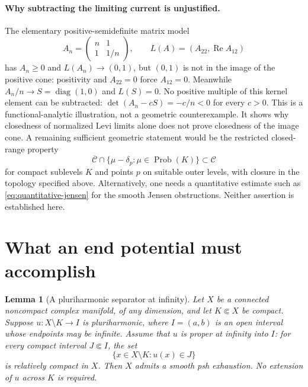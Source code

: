 \documentclass[11pt]{article}
\newtheorem{lemma}[theorem]{Lemma}
\theoremstyle{remark}
\begin{document}
\paragraph{Why subtracting the limiting current is unjustified.}
The elementary positive-semidefinite matrix model
\[
 A_n=\begin{pmatrix}n&1\\1&1/n\end{pmatrix},\qquad
 L(A)=(A_{22},\operatorname{Re}A_{12})
\]
has $A_n\ge0$ and $L(A_n)\to(0,1)$, but $(0,1)$ is not in the image
of the positive cone: positivity and $A_{22}=0$ force $A_{12}=0$.
Meanwhile $A_n/n\to S=\operatorname{diag}(1,0)$ and $L(S)=0$.
No positive multiple of this kernel element can be subtracted:
$\det(A_n-cS)=-c/n<0$ for every $c>0$.
This is a functional-analytic illustration, not a geometric
counterexample. It shows why closedness of normalized Levi limits alone
does not prove closedness of the image cone. A remaining sufficient
geometric statement would be the restricted closed-range property
\[
 \overline{\mathcal C}\cap
   \{\mu-\delta_p:\mu\in\operatorname{Prob}(K)\}
 \subset\mathcal C
\]
for compact sublevels $K$ and points $p$ on suitable outer levels,
with closure in the topology specified above. Alternatively, one needs
a quantitative estimate such as \eqref{eq:quantitative-jensen} for the
smooth Jensen obstructions. Neither assertion is established here.



\section{What an end potential must accomplish}\label{sec:separation-envelope}

\begin{lemma}[A pluriharmonic separator at infinity]
\label{lem:interval-separator}
Let $X$ be a connected noncompact complex manifold, of any dimension,
and let $K\Subset X$ be compact. Suppose $u:X\setminus K\to I$ is
pluriharmonic, where $I=(a,b)$ is an open interval whose endpoints may
be infinite. Assume that $u$ is proper at infinity into $I$: for every
compact interval $J\Subset I$, the set
\[
 \{x\in X\setminus K:u(x)\in J\}
\]
is relatively compact in $X$. Then $X$ admits a smooth psh exhaustion.
No extension of $u$ across $K$ is required.
\end{lemma}
\end{document}
